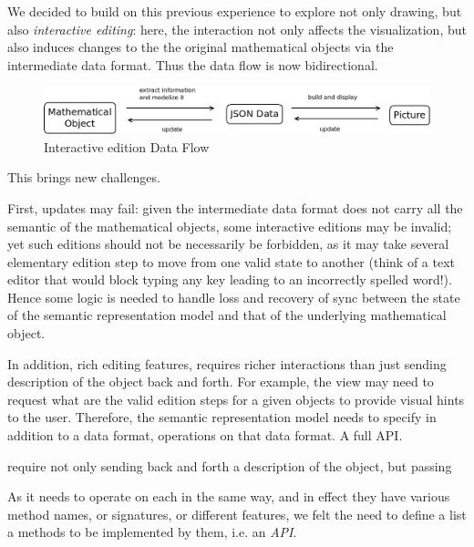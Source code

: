 \documentclass{deliverablereport}
\begin{document}
We decided to build on this previous experience to explore not only
drawing, but also \emph{interactive editing}: here, the interaction
not only affects the visualization, but also induces changes to the
the original mathematical objects via the intermediate data format.
Thus the data flow is now bidirectional.

\begin{figure}[h]
  \begin{center}
    \includegraphics[width=\textwidth]{schemas/DoubleSens}
  \end{center}
  \caption{Interactive edition Data Flow}
  \label{fig:dataflow1}
\end{figure}

This brings new challenges.

First, updates may fail: given the intermediate data format does not
carry all the semantic of the mathematical objects, some interactive
editions may be invalid; yet such editions should not be necessarily
be forbidden, as it may take several elementary edition step to move
from one valid state to another (think of a text editor that would
block typing any key leading to an incorrectly spelled word!). Hence
some logic is needed to handle loss and recovery of sync between the
state of the semantic representation model and that of the
underlying mathematical object.

In addition, rich editing features, requires richer interactions than
just sending description of the object back and forth. For example,
the view may need to request what are the valid edition steps for a
given objects to provide visual hints to the user. Therefore, the
semantic representation model needs to specify in addition to a data
format, operations on that data format. A full API.

require not only sending back and forth a description of the object,
but passing


As it needs to operate on each in the same way,
and in effect they have various method names, or signatures, or
different features, we felt the need to define a list a methods to be
implemented by them, i.e. an \emph{API}.
\end{document}
